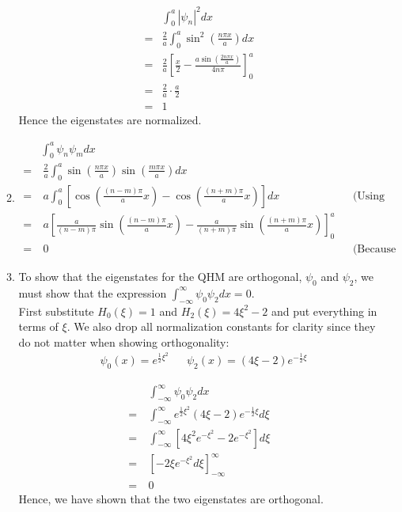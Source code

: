 \documentclass[10pt]{article}
\begin{document}
\begin{enumerate}
\begin{enumerate}
    \begin{align*}
      & \int_{0}^{a} \left| \psi_n \right|^2 dx \\
      =& \frac{2}{a} \int_{0}^{a} \sin ^2 \left( \frac{n \pi x}{a} \right) dx\\
      =& \frac{2}{a} \left[ \frac{x}{2} - \frac{a \sin \left( \frac{2 n\pi x}{a} \right)}{4 n\pi} \right]_0^a \\
      =& \frac{2}{a} \cdot \frac{a}{2} \\
      =& 1
    \end{align*}
    Hence the eigenstates are normalized.
  \item 
    \begin{align*}
      &\int_{0}^{a} \psi_n \psi_m dx \\
     =&~\frac{2}{a} \int_{0}^{a} \sin \left( \frac{n \pi x}{a} \right) \sin \left( \frac{m \pi x}{a} \right) dx \\ 
     =&~a \int_{0}^{a} \left[ \cos \left( \frac{\left( n-m \right)\pi}{a}x \right) - \cos \left( \frac{\left( n+m \right)\pi}{a}x \right) \right]dx && \text{(Using the trig identity from 1c)} \\
     =&~a \left[ \frac{a}{\left( n-m \right)\pi} \sin \left( \frac{\left( n-m \right)\pi}{a}x \right) - \frac{a}{\left( n+m \right)\pi} \sin \left( \frac{\left( n+m \right)\pi}{a}x \right) \right]_0^a \\
     =&~0 && \text{(Because m and n are integers)}
   \end{align*}
  \item 
    To show that the eigenstates for the QHM are orthogonal, $ \psi_0 $ and $ \psi_2 $, we must show that the expression $ \int_{-\infty}^{\infty} \psi_0 \psi_2 dx = 0$. \\
    First substitute $ H_0 \left( \xi \right)=1 $ and $ H_2 \left( \xi \right)=4\xi^2-2 $ and put everything in terms of $ \xi $.
    We also drop all normalization constants for clarity since they do not matter when showing orthogonality:
    \begin{align*}
      &\psi_0 \left( x \right) = e ^ {\frac{1}{2}\xi ^2} && \psi_2 \left( x \right) = \left( 4 \xi - 2 \right) e ^ {- \frac{1}{2} \xi}
    \end{align*}

    \begin{align*}
      &~\int_{-\infty}^{\infty} \psi_0 \psi_2 dx \\
     =&~\int_{-\infty}^{\infty} e ^ {\frac{1}{2}\xi ^2} \left( 4 \xi - 2 \right) e ^ {- \frac{1}{2} \xi} d\xi \\
     =&~ \int_{-\infty}^{\infty} \left[ 4\xi^2 e ^ {-\xi^2} -2e ^ {-\xi^2} \right]d\xi \\
     =&~ \left[ -2\xi e ^ {-\xi^2} d\xi \right]_{-\infty}^{\infty} \\
     =&~ 0
    \end{align*}
    Hence, we have shown that the two eigenstates are orthogonal.
    

\end{enumerate}
\end{enumerate}
\end{document}
